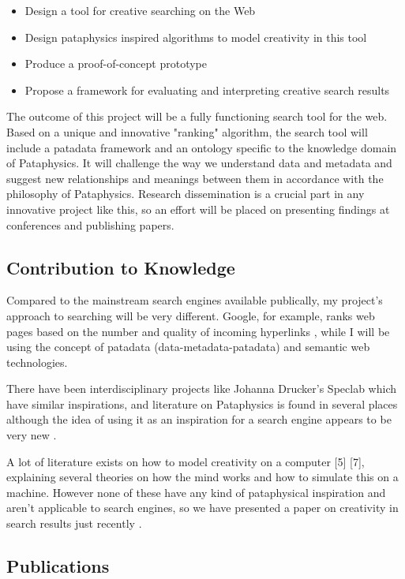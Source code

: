 \begin{itemize}
  \item Design a tool for creative searching on the Web
  \item Design pataphysics inspired algorithms to model creativity in this tool
  \item Produce a proof-of-concept prototype
  \item Propose a framework for evaluating and interpreting creative search results
\end{itemize}

The outcome of this project will be a fully functioning search tool for the web. Based on a unique and innovative "ranking" algorithm, the search tool will include a patadata framework and an ontology specific to the knowledge domain of Pataphysics. It will challenge the way we understand data and metadata and suggest new relationships and meanings between them in accordance with the philosophy of Pataphysics.  Research dissemination is a crucial part in any innovative project like this, so an effort will be placed on presenting findings at conferences and publishing papers.


\subsection{Contribution to Knowledge}

Compared to the mainstream search engines available publically, my project's approach to searching will be very different. Google, for example, ranks web pages based on the number and quality of incoming hyperlinks \citep{Google2012}, while I will be using the concept of patadata (data-metadata-patadata) and semantic web technologies.

There have been interdisciplinary projects like Johanna Drucker's Speclab \citep{Drucker2009} which have similar inspirations, and literature on Pataphysics is found in several places \citep{Bok2002, Hugill2012a} although the idea of using it as an inspiration for a search engine appears to be very new \citep{Hendler2013}.

A lot of literature exists on how to model creativity on a computer [5] [7], explaining several theories on how the mind works and how to simulate this on a machine. However none of these have any kind of pataphysical inspiration and aren't applicable to search engines, so we have presented a paper on creativity in search results just recently \citep{Raczinski2013}.

\subsection{Publications}

